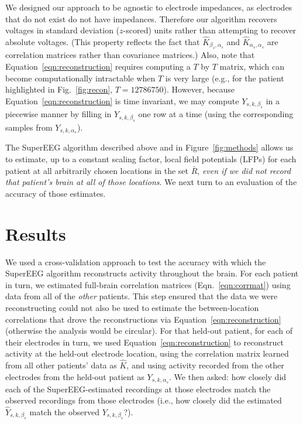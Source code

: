 \documentclass[11pt]{article}
\begin{document}
We designed our approach to be agnostic to electrode impedances, as
electrodes that do not exist do not have impedances.  Therefore our
algorithm recovers voltages in standard deviation ($z$-scored) units
rather than attempting to recover absolute voltages. (This property
reflects the fact that $\hat{K}_{\beta_s, \alpha_s}$ and
$\hat{K}_{\alpha_s, \alpha_s}$ are correlation matrices rather than
covariance matrices.)  Also, note that
Equation~\ref{eqn:reconstruction} requires computing a $T$ by $T$
matrix, which can become computationally intractable when $T$ is very
large (e.g., for the patient highlighted in Fig.~\ref{fig:recon}, $T =
12786750$). However, because Equation~\ref{eqn:reconstruction} is time
invariant, we may compute $Y_{s,k,\beta_s}$ in a piecewise
manner by filling in $Y_{s,k,\beta_s}$ one row at a time (using the
corresponding samples from $Y_{s, k, \alpha_s}$).

The SuperEEG algorithm described above and in Figure~\ref{fig:methods}
allows us to estimate, up to a constant scaling factor, local field
potentials (LFPs) for each patient at all arbitrarily chosen locations
in the set $\bar{R}$, \textit{even if we did not record that patient's
  brain at all of those locations}.  We next turn to an evaluation of
the accuracy of those estimates.

\section*{Results}
We used a cross-validation approach to test the accuracy with which
the SuperEEG algorithm reconstructs activity throughout the brain.
For each patient in turn, we estimated full-brain correlation matrices
(Eqn.~\ref{eqn:corrmat}) using data from all of the \textit{other}
patients. This step ensured that the data we were reconstructing could
not also be used to estimate the between-location correlations that
drove the reconstructions via Equation~\ref{eqn:reconstruction}
(otherwise the analysis would be circular).  For that held-out
patient, for each of their electrodes in turn, we used
Equation~\ref{eqn:reconstruction} to reconstruct activity at the
held-out electrode location, using the correlation matrix learned from
all other patients' data as $\hat{K}$, and using activity recorded
from the other electrodes from the held-out patient as
$Y_{s, k, \alpha_s}$.  We then asked: how closely did each of the
SuperEEG-estimated recordings at those electrodes match the observed
recordings from those electrodes (i.e., how closely did the estimated
$\hat{Y}_{s, k, \beta_s}$ match the observed $Y_{s, k, \beta_s}$?).
\end{document}
